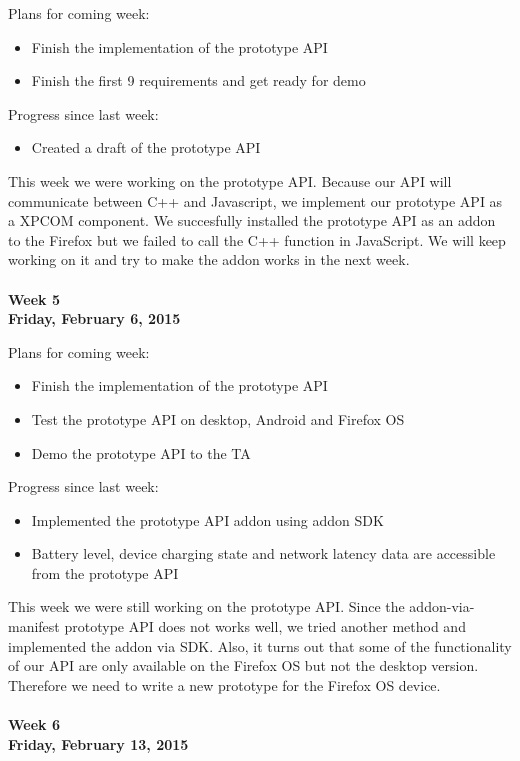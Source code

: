 \noindent Plans for coming week:
\begin{itemize}
\item Finish the implementation of the prototype API
\item Finish the first 9 requirements and get ready for demo
\end{itemize}

\noindent Progress since last week:
\begin{itemize}
\item Created a draft of the prototype API
\end{itemize}

\noindent This week we were working on the prototype API. Because our API will communicate between C++ and Javascript, we implement our prototype API as a XPCOM component. We succesfully installed the prototype API as an addon to the Firefox but we failed to call the C++ function in JavaScript. We will keep working on it and try to make the addon works in the next week. \\
\\
\textbf{Week 5\\Friday, February 6, 2015\\}

\noindent Plans for coming week:
\begin{itemize}
\item Finish the implementation of the prototype API
\item Test the prototype API on desktop, Android and Firefox OS
\item Demo the prototype API to the TA
\end{itemize}

\noindent Progress since last week:
\begin{itemize}
\item Implemented the prototype API addon using addon SDK
\item Battery level, device charging state and network latency data are accessible from the prototype API
\end{itemize}

\noindent This week we were still working on the prototype API. Since the addon-via-manifest prototype API does not works well, we tried another method and implemented the addon via SDK. Also, it turns out that some of the functionality of our API are only available on the Firefox OS but not the desktop version. Therefore we need to write a new prototype for the Firefox OS device. \\
\\
\textbf{Week 6\\Friday, February 13, 2015\\}

